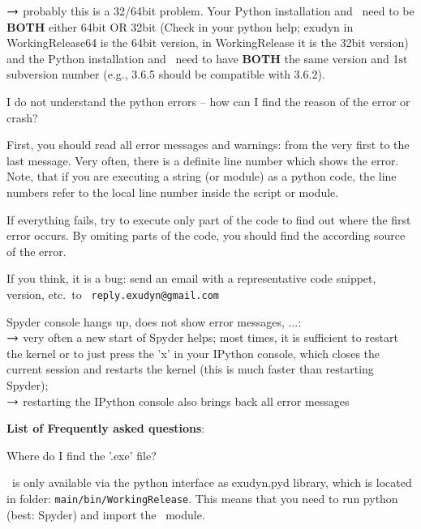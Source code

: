 	$\ra$ probably this is a 32/64bit problem. Your Python installation and \codeName\ need to be {\bf BOTH} either 64bit OR 32bit (Check in your python help; exudyn in WorkingRelease64 is the 64bit version, in WorkingRelease it is the 32bit version) and the Python installation and \codeName\ need to have {\bf BOTH} the same version and 1$\mathrm{st}$ subversion number (e.g., 3.6.5 should be compatible with 3.6.2).
  \item I do not understand the python errors -- how can I find the reason of the error or crash?
	\bi
	\item[$\ra$] First, you should read all error messages and warnings: from the very first to the last message. Very often, there is a definite line number which shows the error. Note, that if you are executing a string (or module) as a python code, the line numbers refer to the local line number inside the script or module.
	\item[$\ra$] If everything fails, try to execute only part of the code to find out where the first error occurs. By omiting parts of the code, you should find the according source of the error.
	\item[$\ra$] If you think, it is a bug: send an email with a representative code snippet, version, etc.\ to \texttt{ reply.exudyn@gmail.com}
	\ei
  \item Spyder console hangs up, does not show error messages, ...:\\
	$\ra$ very often a new start of Spyder helps; most times, it is sufficient to restart the kernel or to just press the 'x' in your IPython console, which closes the current session and restarts the kernel (this is much faster than restarting Spyder); \\
	$\ra$ restarting the IPython console also brings back all error messages
	
\en
{\bf List of Frequently asked questions}:
\bn
  \item Where do I find the '.exe' file?
	\bi
	\item[$\ra$] \codeName\ is only available via the python interface as exudyn.pyd library, which is located in folder: \texttt{main/bin/WorkingRelease}. This means that you need to run python (best: Spyder) and import the \codeName\ module.
	\ei

